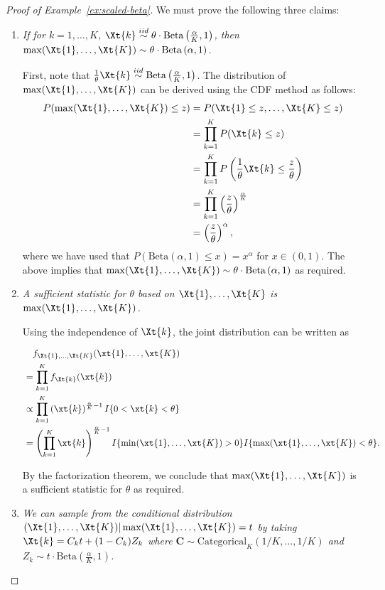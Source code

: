 \documentclass[12pt]{article}
\begin{document}
\begin{proof}[Proof of Example~\ref{ex:scaled-beta}]
We must prove the following three claims:
\begin{enumerate}
    \item \emph{If for $k=1,\dots,K$, $\Xt{k} \overset{iid}{\sim} \theta \cdot\text{Beta}\left(\frac{\alpha}{K},1\right)$, then $\max(\Xt{1}, \dots,\Xt{K}) \sim \theta \cdot\text{Beta}\left(\alpha,1\right)$.}  
    
First, note that $\frac{1}{\theta}\Xt{k} \overset{iid}{\sim} \text{Beta}\left(\frac{\alpha}{K},1\right)$. The distribution of $\max(\Xt{1},\dots,\Xt{K})$ can be derived using the CDF method as follows:
\begin{align*}
    P(\max(\Xt{1},\dots,\Xt{K})\le z) &= P(\Xt{1} \le z,\dots, \Xt{K} \le z) \\
    &= \prod_{k=1}^K P(\Xt{k} \le z) \\
    &= \prod_{k=1}^K P\left(\frac{1}{\theta}\Xt{k} \le \frac{z}{\theta}\right) \\
    &= \prod_{k=1}^K \left(\frac{z}{\theta}\right)^{\frac{\alpha}{K}} \\
    &= \left(\frac{z}{\theta}\right)^\alpha,
\end{align*}
where we have used that $P(\text{Beta}(\alpha,1)\le x)=x^\alpha$ for $x\in(0,1)$. 
The above implies that $\max(\Xt{1},\dots,\Xt{K})\sim\theta \cdot\text{Beta}\left(\alpha,1\right)$ as required.
    \item \emph{A sufficient statistic for $\theta$ based on $\Xt{1},\dots,\Xt{K}$ is $\max(\Xt{1},\dots,\Xt{K})$.} 

Using the independence of $\Xt{k}$, the joint distribution can be written as

\begin{align*} 
&\quad f_{\Xt{1},\dots,\Xt{K}}(\xt{1},\dots,\xt{K}) \\
&= \prod_{k=1}^K f_{\Xt{k}}(\xt{k}) \\
&\propto \prod_{k=1}^K\left(\xt{k}\right)^{\frac{\alpha}{K}-1}I\{0<\xt{k}<\theta\} \\
&= \left(\prod_{k=1}^K\xt{k}\right)^{\frac{\alpha}{K}-1}I\{\min(\xt{1},\dots,\xt{K})>0\}I\{\max(\xt{1},\dots,\xt{K})<\theta\}.
\end{align*}

By the factorization theorem, we conclude that $\max(\Xt{1},\dots,\Xt{K})$ is a sufficient statistic for $\theta$ as required.

    \item \emph{We can sample from the conditional distribution $(\Xt{1},\dots,\Xt{K})|\max(\Xt{1},\dots,\Xt{K})=t$ by taking $\Xt{k}=C_kt+(1-C_k)Z_k$ where $\mathbf{C} \sim \text{Categorical}_K(1/K,\dots,1/K)$ and $Z_k\sim t\cdot\text{Beta}(\frac{\alpha}{K},1)$.} 


\end{enumerate}
\end{proof}
\end{document}
